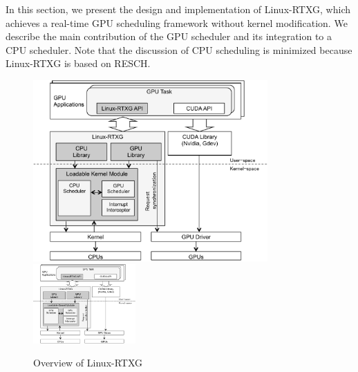 \label{sec:design_imple}
In this section, we present the design and implementation of Linux-RTXG,
which achieves a real-time GPU scheduling framework without kernel modification.
We describe the main contribution of the GPU scheduler and its integration to a CPU scheduler.
Note that the discussion of CPU scheduling is minimized because Linux-RTXG is based on RESCH.

\begin{figure}[t]
\begin{center}
\ifthesis
\includegraphics[width=0.8\textwidth]{img/overview.pdf}
\else
\includegraphics[width=0.35\textwidth]{img/overview.pdf}
\fi
\caption{Overview of Linux-RTXG}
\label{fig:overview}
\end{center}
\end{figure}

